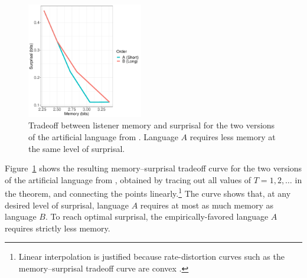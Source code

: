 \begin{figure}
\centering
\includegraphics[width=0.45\textwidth]{figures/toy-mem-surp.pdf}
	\caption{Tradeoff between listener memory and surprisal for the two versions of the artificial language from \cite{fedzechkina-human-2017}. Language $A$ requires less memory at the same level of surprisal. }
	\label{fig:toy-listener-tradeoff}
\end{figure}

Figure~\ref{fig:toy-listener-tradeoff} shows the resulting memory--surprisal tradeoff curve for the two versions of the artificial language from \cite{fedzechkina-human-2017}, obtained by tracing out all values of $T=1, 2, \dots$ in the theorem, and connecting the points linearly.\footnote{Linear interpolation is justified because rate-distortion curves such as the memory--surprisal tradeoff curve are convex \citep{berger2003rate}.}
The curve shows that, at any desired level of surprisal, language $A$ requires at most as much memory as language $B$.
To reach optimal surprisal, the empirically-favored language $A$ requires strictly less memory.







